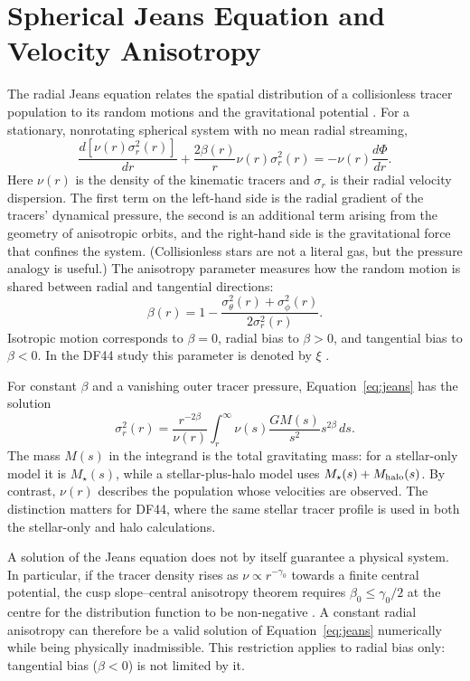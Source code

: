\documentclass[12pt,a4paper]{report}
\numberwithin{equation}{chapter}
\begin{document}
\section{Spherical Jeans Equation and Velocity Anisotropy}

The radial Jeans equation relates the spatial distribution of a collisionless tracer population to its random motions and the gravitational potential \cite{binney2008}. For a stationary, nonrotating spherical system with no mean radial streaming,
\begin{equation}
 \frac{d[\nu(r)\sigma_r^2(r)]}{dr}
 +\frac{2\beta(r)}{r}\nu(r)\sigma_r^2(r)
 =-\nu(r)\frac{d\Phi}{dr}.
 \label{eq:jeans}
\end{equation}
Here $\nu(r)$ is the density of the kinematic tracers and $\sigma_r$ is their radial velocity dispersion. The first term on the left-hand side is the radial gradient of the tracers' dynamical pressure, the second is an additional term arising from the geometry of anisotropic orbits, and the right-hand side is the gravitational force that confines the system. (Collisionless stars are not a literal gas, but the pressure analogy is useful.) The anisotropy parameter measures how the random motion is shared between radial and tangential directions:
\begin{equation}
 \beta(r)=1-\frac{\sigma_\theta^2(r)+\sigma_\phi^2(r)}{2\sigma_r^2(r)}.
 \label{eq:beta}
\end{equation}
Isotropic motion corresponds to $\beta=0$, radial bias to $\beta>0$, and tangential bias to $\beta<0$. In the DF44 study this parameter is denoted by $\xi$ \cite{bhatia2024}.

For constant $\beta$ and a vanishing outer tracer pressure, Equation~\eqref{eq:jeans} has the solution
\begin{equation}
 \sigma_r^2(r)=\frac{r^{-2\beta}}{\nu(r)}
 \int_r^\infty\nu(s)\frac{GM(s)}{s^2}s^{2\beta}\,ds.
 \label{eq:jeanssolution}
\end{equation}
The mass $M(s)$ in the integrand is the total gravitating mass: for a stellar-only model it is $M_\star(s)$, while a stellar-plus-halo model uses $M_\star(s)+M_{\rm halo}(s)$. By contrast, $\nu(r)$ describes the population whose velocities are observed. The distinction matters for DF44, where the same stellar tracer profile is used in both the stellar-only and halo calculations.

A solution of the Jeans equation does not by itself guarantee a physical system. In particular, if the tracer density rises as $\nu\propto r^{-\gamma_0}$ towards a finite central potential, the cusp slope--central anisotropy theorem requires $\beta_0\le\gamma_0/2$ at the centre for the distribution function to be non-negative \cite{anevans2006}. A constant radial anisotropy can therefore be a valid solution of Equation~\eqref{eq:jeans} numerically while being physically inadmissible. This restriction applies to radial bias only: tangential bias ($\beta<0$) is not limited by it.
\end{document}
